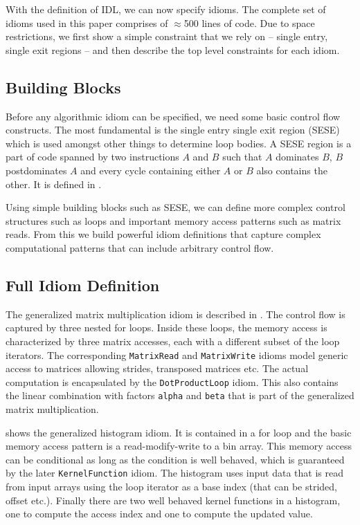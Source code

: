     With the definition of IDL, we can now specify idioms.
    The complete set of idioms used in this paper comprises of $\approx$500
    lines of code.
    Due to space restrictions, we first show a simple constraint that we rely
    on -- single entry, single exit regions -- and then describe the top level
    constraints for each idiom.

\subsection{Building Blocks}

    Before any algorithmic idiom can be specified, we need some basic control
    flow constructs.
    The most fundamental is the single entry single exit region (SESE)
    \cite{johnson1994program} which is used amongst other things to determine
    loop bodies.
    A SESE region is a part of code spanned by two instructions $A$ and $B$ such
    that $A$ dominates $B$, $B$ postdominates $A$ and every cycle containing
    either $A$ or $B$ also contains the other.
    It is defined in .

    Using simple building blocks such as SESE, we can define more complex
    control structures such as loops and important memory access patterns such
    as matrix reads.
    From this we build powerful idiom definitions that capture complex
    computational patterns that can include arbitrary control flow.

\subsection{Full Idiom Definition}

    The generalized matrix multiplication idiom is described in .
    The control flow is captured by three nested for loops.
    Inside these loops, the memory access is characterized by three matrix
    accesses, each with a different subset of the loop iterators.
    The corresponding \texttt{MatrixRead} and \texttt{MatrixWrite} idioms model
    generic access to matrices allowing strides, transposed matrices etc.
    The actual computation is encapsulated by the \texttt{DotProductLoop} idiom.
    This also contains the linear combination with factors \texttt{alpha} and
    \texttt{beta} that is part of the generalized matrix multiplication.

     shows the generalized histogram idiom.
    It is contained in a for loop and the basic memory access pattern is a
    read-modify-write to a bin array.
    This memory access can be conditional as long as the condition is well
    behaved, which is guaranteed by the later
    \texttt{KernelFunction} idiom.
    The histogram uses input data that is read from input arrays using the loop iterator as a base index (that can be
    strided, offset etc.).
    Finally there are two well behaved kernel functions in a histogram, one to compute the access index and one to compute
    the updated value.

